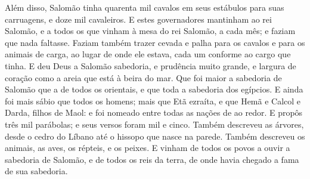 {  Além disso, Salomão tinha quarenta mil cavalos em seus estábulos para suas carruagens, e doze mil cavaleiros.
  E estes governadores mantinham ao rei Salomão, e a todos os que vinham à mesa do rei Salomão, a cada mês; e faziam que nada faltasse.
  Faziam também trazer cevada e palha para os cavalos e para os animais de carga, ao lugar de onde ele estava, cada um conforme ao cargo que tinha.
  E deu Deus a Salomão sabedoria, e prudência muito grande, e largura de coração como a areia que está à beira do mar.
  Que foi maior a sabedoria de Salomão que a de todos os orientais, e que toda a sabedoria dos egípcios.
  E ainda foi mais sábio que todos os homens; mais que Etã ezraíta, e que Hemã e Calcol e Darda, filhos de Maol: e foi nomeado entre todas as nações de ao redor.
  E propôs três mil parábolas; e seus versos foram mil e cinco.
  Também descreveu as árvores, desde o cedro do Líbano até o hissopo que nasce na parede. Também descreveu os animais, as aves, os répteis, e os peixes.
  E vinham de todos os povos a ouvir a sabedoria de Salomão, e de todos os reis da terra, de onde havia chegado a fama de sua sabedoria.
\par }

